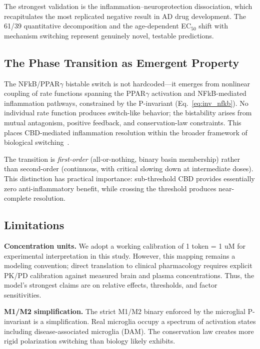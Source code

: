 \documentclass[10pt,letterpaper]{article}
\begin{document}
The strongest validation is the inflammation--neuroprotection dissociation, which recapitulates the most replicated negative result in AD drug development. The 61/39 quantitative decomposition and the age-dependent EC$_{50}$ shift with mechanism switching represent genuinely novel, testable predictions.

\subsection{The Phase Transition as Emergent Property}

The NFkB/PPAR$\gamma$ bistable switch is not hardcoded---it emerges from nonlinear coupling of rate functions spanning the PPAR$\gamma$ activation and NFkB-mediated inflammation pathways, constrained by the P-invariant (Eq.~\ref{eq:inv_nfkb}). No individual rate function produces switch-like behavior; the bistability arises from mutual antagonism, positive feedback, and conservation-law constraints. This places CBD-mediated inflammation resolution within the broader framework of biological switching~\cite{novick1957,altan2005,rehm2006}.

The transition is \textit{first-order} (all-or-nothing, binary basin membership) rather than second-order (continuous, with critical slowing down at intermediate doses). This distinction has practical importance: sub-threshold CBD provides essentially zero anti-inflammatory benefit, while crossing the threshold produces near-complete resolution.

\subsection{Limitations}

\vspace{3pt}
\noindent\textbf{Concentration units.} We adopt a working calibration of 1 token = 1 uM for experimental interpretation in this study. However, this mapping remains a modeling convention; direct translation to clinical pharmacology requires explicit PK/PD calibration against measured brain and plasma concentrations. Thus, the model's strongest claims are on relative effects, thresholds, and factor sensitivities.

\vspace{3pt}
\noindent\textbf{M1/M2 simplification.} The strict M1/M2 binary enforced by the microglial P-invariant is a simplification. Real microglia occupy a spectrum of activation states including disease-associated microglia (DAM). The conservation law creates more rigid polarization switching than biology likely exhibits.
\end{document}

